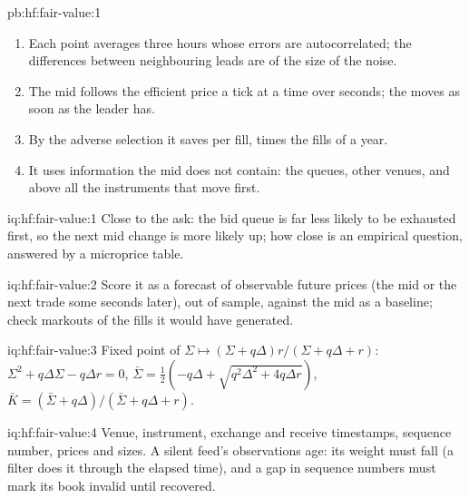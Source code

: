 \begin{solution}{pb:hf:fair-value:1}
\begin{enumerate}
\item Each point averages three hours whose errors are autocorrelated; the differences between neighbouring leads are of the size of the noise.
\item The mid follows the efficient price a tick at a time over seconds; the  moves as soon as the leader has.
\item By the adverse selection it saves per fill, times the fills of a year.
\item It uses information the mid does not contain: the queues, other venues, and above all the instruments that move first.
\end{enumerate}
\end{solution}

\begin{solution}{iq:hf:fair-value:1}
Close to the ask: the bid queue is far less likely to be exhausted first, so the next mid change is more likely up; how close is an empirical
question, answered by a microprice table.
\end{solution}

\begin{solution}{iq:hf:fair-value:2}
Score it as a forecast of observable future prices (the mid or the next trade some seconds later), out of sample, against the mid as a baseline;
check markouts of the fills it would have generated.
\end{solution}

\begin{solution}{iq:hf:fair-value:3}
Fixed point of $\Sigma\mapsto(\Sigma+q\Delta)r/(\Sigma+q\Delta+r)$: $\Sigma^2+q\Delta\Sigma-q\Delta r=0$,
$\bar\Sigma=\tfrac12(-q\Delta+\sqrt{q^2\Delta^2+4q\Delta r})$, $\bar K=(\bar\Sigma+q\Delta)/(\bar\Sigma+q\Delta+r)$.
\end{solution}

\begin{solution}{iq:hf:fair-value:4}
Venue, instrument, exchange and receive timestamps, sequence number, prices and sizes. A silent feed's observations age: its weight must fall (a
filter does it through the elapsed time), and a gap in sequence numbers must mark its book invalid until recovered.
\end{solution}

